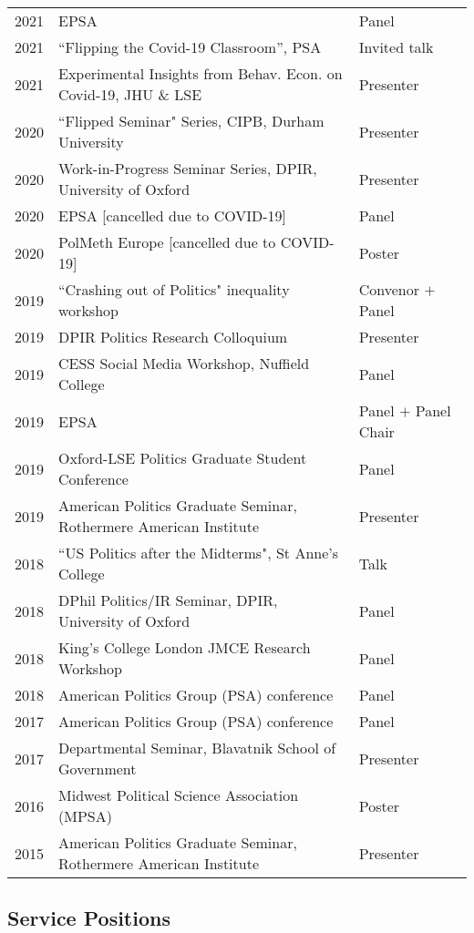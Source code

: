 \documentclass[11pt, a4paper]{article}
\begin{document}
 \begin{tabular}{lll}
     2021 & EPSA & Panel \\
     2021 & ``Flipping the Covid-19 Classroom'', PSA & Invited talk \\
     2021 &  Experimental Insights from Behav. Econ. on Covid-19, JHU \& LSE & Presenter \\
     2020 & ``Flipped Seminar" Series, CIPB, Durham University & Presenter \\
     2020 & Work-in-Progress Seminar Series, DPIR, University of Oxford & Presenter \\
     2020 & EPSA [cancelled due to COVID-19] & Panel \\
     2020 & PolMeth Europe [cancelled due to COVID-19] & Poster \\
     2019 & ``Crashing out of Politics" inequality workshop & Convenor $+$ Panel \\
     2019 & DPIR Politics Research Colloquium & Presenter \\
     2019 & CESS Social Media Workshop, Nuffield College & Panel \\
     2019 & EPSA  & Panel $+$ Panel Chair \\
     2019 & Oxford-LSE Politics Graduate Student Conference & Panel \\
     2019 & American Politics Graduate Seminar, Rothermere American Institute & Presenter \\
     2018 & ``US Politics after the Midterms", St Anne's College & Talk \\
     2018 & DPhil Politics/IR Seminar, DPIR, University of Oxford & Panel \\
     2018 & King's College London JMCE Research Workshop & Panel \\
     2018 & American Politics Group (PSA) conference & Panel \\
     2017 & American Politics Group (PSA) conference & Panel \\
     2017 & Departmental Seminar, Blavatnik School of Government & Presenter \\
     2016 & Midwest Political Science Association (MPSA) & Poster \\
     2015 & American Politics Graduate Seminar, Rothermere American Institute & Presenter
 \end{tabular}

 \subsection*{Service Positions}
\end{document}
